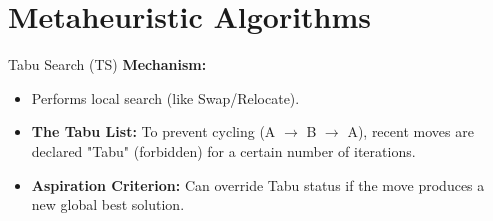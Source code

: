 \documentclass{beamer}
\begin{document}
    
    

\section{Metaheuristic Algorithms}

\begin{frame}{Tabu Search (TS)}
    \textbf{Mechanism:} \cite{barbarosoglu1999tabu}
    \begin{itemize}
        \item Performs local search (like Swap/Relocate).
        \item \textbf{The Tabu List:} To prevent cycling (A $\to$ B $\to$ A), recent moves are declared "Tabu" (forbidden) for a certain number of iterations.
        \item \textbf{Aspiration Criterion:} Can override Tabu status if the move produces a new global best solution.
    \end{itemize}
\end{frame}
\end{document}
